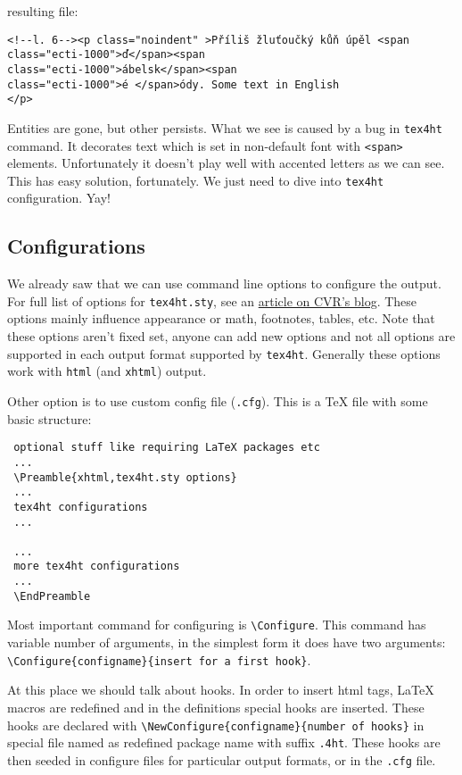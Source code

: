resulting file:

\begin{verbatim}
<!--l. 6--><p class="noindent" >Příliš žluťoučký kůň úpěl <span 
class="ecti-1000">ď</span><span 
class="ecti-1000">ábelsk</span><span 
class="ecti-1000">é </span>ódy. Some text in English
</p> 
\end{verbatim}

Entities are gone, but other persists. What we see is caused by a bug in
\texttt{tex4ht} command. It decorates text which is set in non-default
font with \texttt{\textless{}span\textgreater{}} elements. Unfortunately
it doesn't play well with accented letters as we can see. This has easy
solution, fortunately. We just need to dive into \texttt{tex4ht}
configuration. Yay!

\hypertarget{configurations}{%
\subsection{Configurations}\label{configurations}}

We already saw that we can use command line options to configure the
output. For full list of options for \texttt{tex4ht.sty}, see an
\href{http://www.cvr.cc/?p=504}{article on CVR's blog}. These options
mainly influence appearance or math, footnotes, tables, etc. Note that
these options aren't fixed set, anyone can add new options and not all
options are supported in each output format supported by
\texttt{tex4ht}. Generally these options work with \texttt{html} (and
\texttt{xhtml}) output.

Other option is to use custom config file (\texttt{.cfg}). This is a TeX
file with some basic structure:

\begin{verbatim}
 optional stuff like requiring LaTeX packages etc
 ...
 \Preamble{xhtml,tex4ht.sty options}
 ...
 tex4ht configurations
 ...
  
 ...
 more tex4ht configurations
 ...
 \EndPreamble
\end{verbatim}

Most important command for configuring is
\texttt{\textbackslash{}Configure}. This command has variable number of
arguments, in the simplest form it does have two arguments:
\texttt{\textbackslash{}Configure\{configname\}\{insert\ for\ a\ first\ hook\}}.

At this place we should talk about hooks. In order to insert html tags,
LaTeX macros are redefined and in the definitions special hooks are
inserted. These hooks are declared with
\texttt{\textbackslash{}NewConfigure\{configname\}\{number\ of\ hooks\}}
in special file named as redefined package name with suffix
\texttt{.4ht}. These hooks are then seeded in configure files for
particular output formats, or in the \texttt{.cfg} file.

